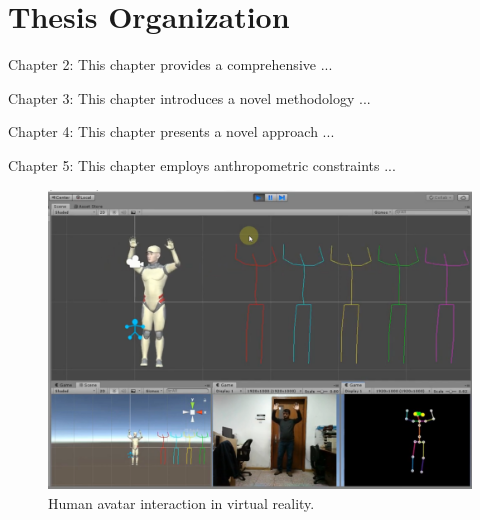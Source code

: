 \section{Thesis Organization}
\noindent
Chapter 2: This chapter provides a comprehensive ...

\noindent
Chapter 3: This chapter introduces a novel methodology ...

\noindent
Chapter 4: This chapter presents a novel approach ...

\noindent
Chapter 5: This chapter employs anthropometric constraints ...



\begin{figure}[!t]
	\centering
	\includegraphics[width=1\textwidth]{figures/chapter1/fig_human_avatar_2}
	\caption{Human avatar interaction in virtual reality.}
	\label{fig_gap}
\end{figure}




